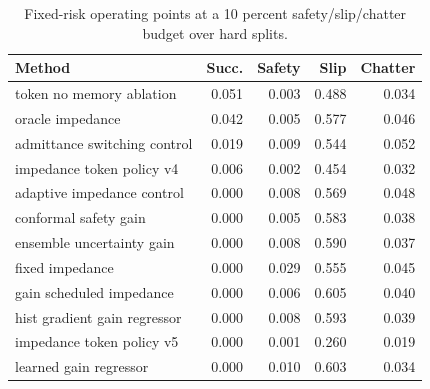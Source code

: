 \begin{table}[t]
\centering
\caption{Fixed-risk operating points at a 10 percent safety/slip/chatter budget over hard splits.}
\label{tab:fixed-risk}
\small
\begin{tabular}{lrrrr}
\toprule
Method & Succ. & Safety & Slip & Chatter \\
\midrule
token no memory ablation & 0.051 & 0.003 & 0.488 & 0.034 \\
oracle impedance & 0.042 & 0.005 & 0.577 & 0.046 \\
admittance switching control & 0.019 & 0.009 & 0.544 & 0.052 \\
impedance token policy v4 & 0.006 & 0.002 & 0.454 & 0.032 \\
adaptive impedance control & 0.000 & 0.008 & 0.569 & 0.048 \\
conformal safety gain & 0.000 & 0.005 & 0.583 & 0.038 \\
ensemble uncertainty gain & 0.000 & 0.008 & 0.590 & 0.037 \\
fixed impedance & 0.000 & 0.029 & 0.555 & 0.045 \\
gain scheduled impedance & 0.000 & 0.006 & 0.605 & 0.040 \\
hist gradient gain regressor & 0.000 & 0.008 & 0.593 & 0.039 \\
impedance token policy v5 & 0.000 & 0.001 & 0.260 & 0.019 \\
learned gain regressor & 0.000 & 0.010 & 0.603 & 0.034 \\
\bottomrule
\end{tabular}
\end{table}
